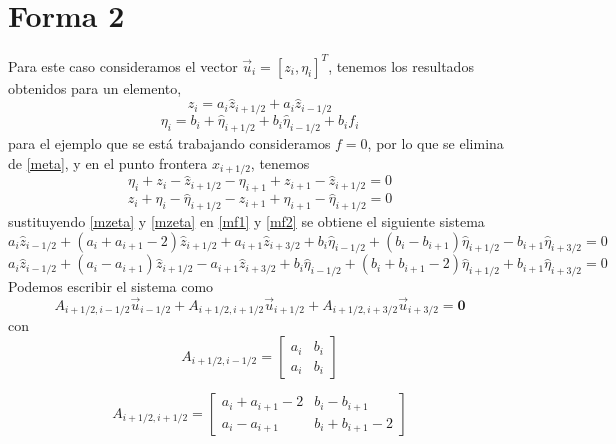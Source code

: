\documentclass[]{article}%
\newcommand{\hz}{\hat{z}}
\newcommand{\heta}{\hat{\eta}}
\begin{document}
\section*{Forma 2}
Para este caso consideramos el vector $\vec{u}_i=\left[z_i,\eta_i\right]^T$, 
tenemos los resultados obtenidos para un elemento, 
\begin{equation}\label{mzeta}
	z_i=a_i \hz_{i+1/2} +a_i \hz_{i-1/2}
\end{equation}
\begin{equation}\label{meta}
	\eta_i=b_i+\heta_{i+1/2}+b_i \heta_{i-1/2}+b_i f_i
\end{equation}
para el ejemplo que se está trabajando consideramos $f=0$, por lo que se elimina de \eqref{meta}, 
y en el punto frontera $x_{i+1/2}$, tenemos 
\begin{equation}\label{mf1}
	\eta_i+z_i-\hz_{i+1/2}-\eta_{i+1}+z_{i+1}-\hz_{i+1/2}=0
\end{equation}
\begin{equation}\label{mf2}
	z_i+\eta_i-\heta_{i+1/2} -z_{i+1}+\eta_{i+1}-\heta_{i+1/2}=0
\end{equation}
sustituyendo \eqref{mzeta} y \eqref{mzeta} en \eqref{mf1} y \eqref{mf2} se obtiene el siguiente sistema
\begin{equation}\label{sis1}
	a_i \hz_{i-1/2} +(a_i+a_{i+1}-2)\hz_{i+1/2}+a_{i+1}\hz_{i+3/2} + b_i \heta_{i-1/2} +(b_i-b_{i+1})\heta_{i+1/2} -b_{i+1} \heta_{i+3/2}=0
\end{equation}
\begin{equation}\label{sis2}
	a_i\hz_{i-1/2} + (a_i-a_{i+1})\hz_{i+1/2}-a_{i+1}\hz_{i+3/2}+b_i\heta_{i-1/2}+(b_i+b_{i+1}-2)\heta_{i+1/2} + b_{i+1} \heta_{i+3/2}=0
\end{equation}
Podemos escribir el sistema como 
\begin{equation}
	A_{i+1/2,i-1/2} \vec{u}_{i-1/2} + A_{i+1/2,i+1/2} \vec{u}_{i+1/2} + A_{i+1/2,i+3/2} \vec{u}_{i+3/2}=\mathbf{0}
\end{equation}
con 
\begin{equation}
	A_{i+1/2,i-1/2}=\begin{bmatrix}
	a_i & b_i \\
	a_i & b_i 
	\end{bmatrix}
\end{equation}

\begin{equation}
A_{i+1/2,i+1/2}=\begin{bmatrix}
a_i+a_{i+1}-2 & b_i-b_{i+1} \\
a_i-a_{i+1} & b_i+b_{i+1}-2 
\end{bmatrix}
\end{equation}
\end{document}
